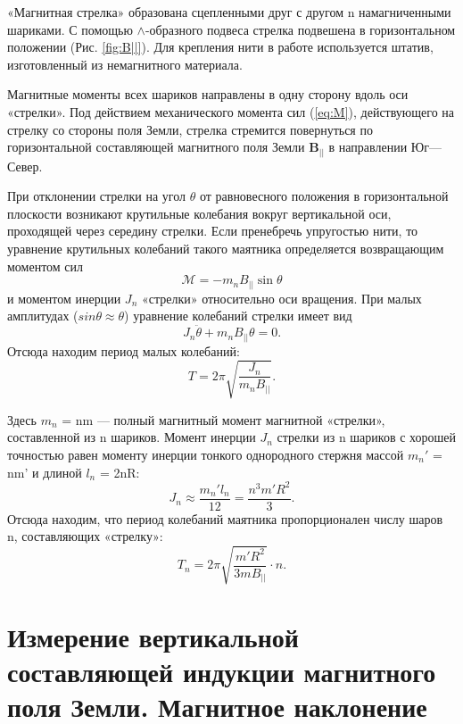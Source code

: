 «Магнитная стрелка» образована сцепленными друг с другом n намагниченными
шариками. С помощью $\wedge$-образного подвеса
стрелка подвешена в горизонтальном положении (Рис. \ref{fig:B||}). Для крепления нити в
работе используется штатив, изготовленный
из немагнитного материала.

Магнитные моменты всех шариков направлены в одну сторону вдоль оси «стрелки». Под действием механического момента
сил (\ref{eq:M}), действующего на стрелку со стороны
поля Земли, стрелка стремится повернуться
по горизонтальной составляющей магнитного поля Земли $\textbf{B}_{||}$ в направлении Юг—Север.

При отклонении стрелки на угол $\theta$ от равновесного положения в горизонтальной плоскости возникают крутильные колебания вокруг вертикальной оси, проходящей через середину стрелки. Если пренебречь упругостью нити, то уравнение крутильных колебаний такого
маятника определяется возвращающим моментом сил
\begin{equation}
    \mathcal{M}=-m_nB_{||}\sin\theta
\end{equation}
и моментом инерции $J_n$ «стрелки» относительно оси вращения. При малых амплитудах ($sin \theta \approx \theta$) уравнение колебаний стрелки имеет вид
\begin{equation}
    J_n\ddot{\theta}+m_nB_{||}\theta=0.
\end{equation}
Отсюда находим период малых колебаний:
\begin{equation}
    T=2\pi \sqrt{\frac{J_n}{m_nB_{||}}}.
\end{equation}

Здесь $m_n$ = nm — полный магнитный момент магнитной «стрелки»,
составленной из n шариков. Момент инерции $J_n$ стрелки из n шариков с
хорошей точностью равен моменту инерции тонкого однородного стержня массой $m_n'$ = nm' и длиной $l_n$ = 2nR:
\begin{equation}
    J_n\approx\frac{m_n'l_n}{12}=\frac{n^3m'R^2}{3}.
\end{equation}
Отсюда находим, что период колебаний маятника пропорционален числу
шаров n, составляющих «стрелку»:
\begin{equation}
    T_n=2\pi\sqrt{\frac{m'R^2}{3mB_{||}}}\cdot n.
    \label{eq:Tn}
\end{equation}

\section{Измерение вертикальной составляющей индукции магнитного поля
Земли. Магнитное наклонение}


